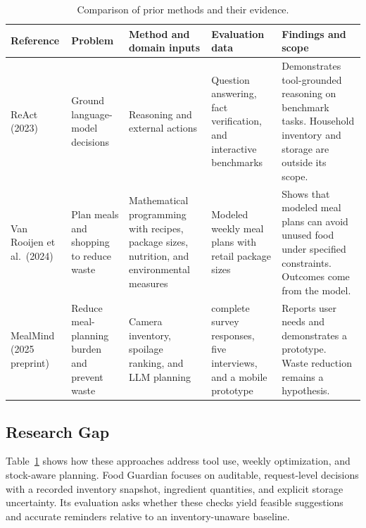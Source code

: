 \begin{table}[t]
\caption{Comparison of prior methods and their evidence.}\label{tab:prior-work}
\centering\footnotesize
\begin{tabular}{@{}>{\raggedright\arraybackslash}p{}>{\raggedright\arraybackslash}p{}>{\raggedright\arraybackslash}p{}>{\raggedright\arraybackslash}p{}>{\raggedright\arraybackslash}p{}@{}}
\toprule
Reference & Problem & Method and domain inputs & Evaluation data & Findings and scope \\
\midrule
ReAct (2023) \cite{yao2023} & Ground language-model decisions & Reasoning and external actions & Question answering, fact verification, and interactive benchmarks & Demonstrates tool-grounded reasoning on benchmark tasks. Household inventory and storage are outside its scope. \\
Van Rooijen et al.\ (2024) \cite{rooijen2024} & Plan meals and shopping to reduce waste & Mathematical programming with recipes, package sizes, nutrition, and environmental measures & Modeled weekly meal plans with retail package sizes & Shows that modeled meal plans can avoid unused food under specified constraints. Outcomes come from the model. \\
MealMind (2025 preprint) \cite{mealmind2025} & Reduce meal-planning burden and prevent waste & Camera inventory, spoilage ranking, and LLM planning & 82 complete survey responses, five interviews, and a mobile prototype & Reports user needs and demonstrates a prototype. Waste reduction remains a hypothesis. \\
\bottomrule
\end{tabular}
\end{table}

\subsection{Research Gap}
Table~\ref{tab:prior-work} shows how these approaches address tool use, weekly optimization, and stock-aware planning. Food Guardian focuses on auditable, request-level decisions with a recorded inventory snapshot, ingredient quantities, and explicit storage uncertainty. Its evaluation asks whether these checks yield feasible suggestions and accurate reminders relative to an inventory-unaware baseline.

